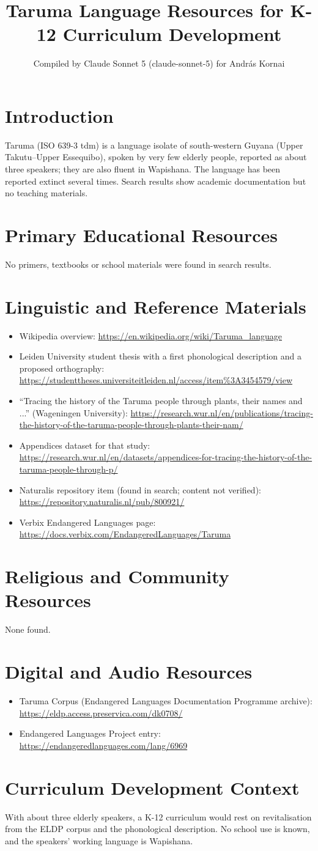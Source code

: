 \documentclass[12pt]{article}
\title{Taruma Language Resources for K-12 Curriculum Development}
\author{Compiled by Claude Sonnet 5 (claude-sonnet-5) for Andr\'as Kornai}
\date{}
\begin{document}
\maketitle
\section{Introduction}
Taruma (ISO 639-3 tdm) is a language isolate of south-western Guyana (Upper Takutu--Upper Essequibo), spoken by very few elderly people, reported as about three speakers; they are also fluent in Wapishana. The language has been reported extinct several times. Search results show academic documentation but no teaching materials.
\section{Primary Educational Resources}
No primers, textbooks or school materials were found in search results.
\section{Linguistic and Reference Materials}
\begin{itemize}
\item Wikipedia overview: \url{https://en.wikipedia.org/wiki/Taruma_language}
\item Leiden University student thesis with a first phonological description and a proposed orthography: \url{https://studenttheses.universiteitleiden.nl/access/item%3A3454579/view}
\item ``Tracing the history of the Taruma people through plants, their names and ...'' (Wageningen University): \url{https://research.wur.nl/en/publications/tracing-the-history-of-the-taruma-people-through-plants-their-nam/}
\item Appendices dataset for that study: \url{https://research.wur.nl/en/datasets/appendices-for-tracing-the-history-of-the-taruma-people-through-p/}
\item Naturalis repository item (found in search; content not verified): \url{https://repository.naturalis.nl/pub/800921/}
\item Verbix Endangered Languages page: \url{https://docs.verbix.com/EndangeredLanguages/Taruma}
\end{itemize}
\section{Religious and Community Resources}
None found.
\section{Digital and Audio Resources}
\begin{itemize}
\item Taruma Corpus (Endangered Languages Documentation Programme archive): \url{https://eldp.access.preservica.com/dk0708/}
\item Endangered Languages Project entry: \url{https://endangeredlanguages.com/lang/6969}
\end{itemize}
\section{Curriculum Development Context}
With about three elderly speakers, a K-12 curriculum would rest on revitalisation from the ELDP corpus and the phonological description. No school use is known, and the speakers' working language is Wapishana.
\end{document}
